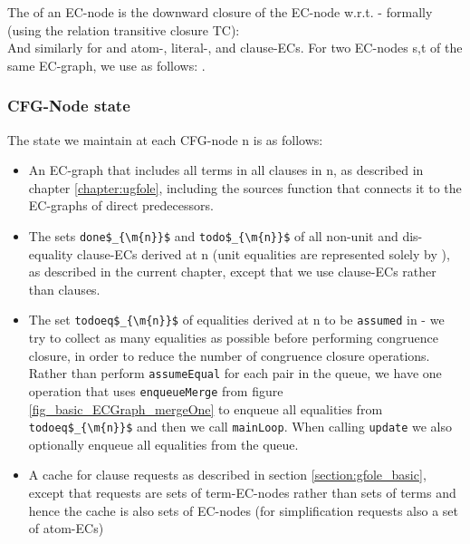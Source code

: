 The  of an EC-node is the downward closure of the EC-node w.r.t. \GFAs{} - formally (using the relation transitive closure TC):\\
And similarly for \GFAs{} and atom-, literal-, and clause-ECs.
For two EC-nodes s,t of the same EC-graph, we use  as follows:
.

\bigskip 

\subsubsection*{CFG-Node state}
The state we maintain at each CFG-node n is as follows:
\begin{itemize}
	\item An EC-graph  that includes all terms in all clauses in n, as described in chapter \ref{chapter:ugfole}, including the sources function that connects it to the EC-graphs of direct predecessors.
	\item The sets \lstinline|done$_{\m{n}}$| and \lstinline|todo$_{\m{n}}$| of all non-unit and dis-equality clause-ECs derived at n (unit equalities are represented solely by ), as described in the current chapter, except that we use clause-ECs rather than clauses.
	\item The set \lstinline|todoeq$_{\m{n}}$| of equalities derived at n to be \lstinline|assumed| in  - we try to collect as many equalities as possible before performing congruence closure, in order to reduce the number of congruence closure operations. 
	Rather than perform \lstinline|assumeEqual| for each pair in the queue, we have one operation that uses \lstinline|enqueueMerge| from figure \ref{fig_basic_ECGraph_mergeOne} to enqueue all equalities from \lstinline|todoeq$_{\m{n}}$| and then we call \lstinline|mainLoop|.
	When calling \lstinline|update| we also optionally enqueue all equalities from the queue.
	\item A cache for clause requests as described in section \ref{section:gfole_basic}, except that requests are sets of term-EC-nodes rather than sets of terms and hence the cache is also sets of EC-nodes (for simplification requests also a set of atom-ECs)
\end{itemize}

